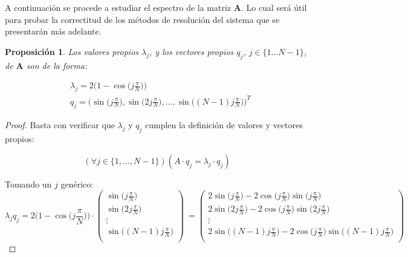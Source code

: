 \documentclass{endm}
\newtheorem{prop_es}{Proposición}
\begin{document}
A continuación se procede a estudiar el espectro de la matriz $\boldsymbol{A}$. Lo cual será útil para probar la correctitud de los métodos de resolución del sistema que se presentarán más adelante.
\begin{prop_es} \label{VAPyVEP}
Los valores propios $\lambda_{j}$, y los vectores propios $q_{j}$, $j \in \{1\dots N-1\}$,  de $\boldsymbol{A}$ son de la forma:

\begin{align*}
    & \lambda_{j} = 2 \bigg(1 - \cos{\bigg(j\frac{\pi}{N}\bigg)} \bigg) \\
    & q_{j} = \bigg(\sin{\bigg(j\frac{\pi}{N}\bigg)} ,\sin{\bigg(2j\frac{\pi}{N}\bigg)} ,\dots,\sin{\bigg((N-1)j\frac{\pi}{N} \bigg)} \bigg)^{T}
\end{align*}
\end{prop_es}
\begin{proof}
Basta con verificar que $\lambda_{j}$ y $q_j$ cumplen la definici\'on de valores y vectores propios:

\begin{equation*}
    (\forall j \in \{1,\dots,N-1\})(A\cdot{q_{j}} = \lambda_{j}\cdot{q_{j}} )
\end{equation*}

Tomando un $j$ genérico:
\begin{equation*}
    \lambda_{j}q_{j} = 2 \bigg(1 - \cos{\bigg(j\frac{\pi}{N}\bigg)} \bigg) \cdot
    \begin{pmatrix}
        \sin{\bigg(j\frac{\pi}{N}\bigg)}\\
        \sin{\bigg(2j\frac{\pi}{N}\bigg)}\\
        \vdots\\
        \sin{\bigg((N-1)j\frac{\pi}{N}\bigg)}\\
    \end{pmatrix}\
    = \begin{pmatrix}
        2\sin{\bigg(j\frac{\pi}{N}\bigg)} - 2\cos{\bigg(j\frac{\pi}{N}\bigg)}\sin{\bigg(j\frac{\pi}{N}\bigg)}\\
        2\sin{\bigg(2j\frac{\pi}{N}\bigg)} - 2\cos{\bigg(j\frac{\pi}{N}\bigg)}\sin{\bigg(2j\frac{\pi}{N}\bigg)}\\
        \vdots\\
        2\sin{\bigg((N-1)j\frac{\pi}{N}\bigg)} - 2\cos{\bigg(j\frac{\pi}{N}\bigg)}\sin{\bigg((N-1)j\frac{\pi}{N}\bigg)}\\
    \end{pmatrix}
\end{equation*}


\end{proof}
\end{document}
